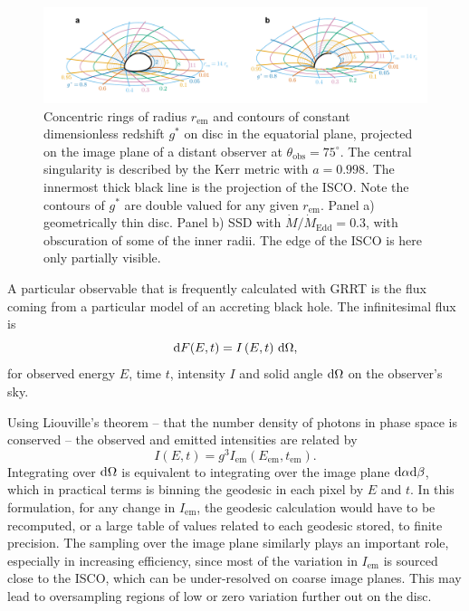 \begin{figure}
    \centering
    \includegraphics[width=0.95\linewidth]{figures/transfer-function.parameterization.pdf}
    \caption{Concentric rings of radius $r_\text{em}$ and contours of constant dimensionless redshift $g^\ast$ on disc in the equatorial plane, projected on the image plane of a distant observer at $\theta_\text{obs} = 75^\circ$. The central singularity is described by the Kerr metric with $a = 0.998$. The innermost thick black line is the projection of the ISCO. Note the contours of $g^\ast$ are double valued for any given $r_\text{em}$. Panel a) geometrically thin disc. Panel b) SSD with $\dot{M} / \dot{M}_\text{Edd} = 0.3$, with obscuration of some of the inner radii. The edge of the ISCO is here only partially visible.}
    \label{fig:transfer-parameterisation}
\end{figure}

A particular observable that is frequently calculated with GRRT is the flux coming from a particular model of an accreting black hole. The infinitesimal flux is
\begin{equation}
\label{eq:infinitesimal-flux}
\text{d} F(E, t) = I\left(E, t\right)\, \text{d} \Omega,
\end{equation}
for observed energy $E$, time $t$, intensity $I$ and solid angle $\text{d} \Omega$ on the observer's sky.

Using Liouville's theorem -- that the number density of photons in phase space is conserved -- the observed and emitted intensities are related by
\begin{equation}
\label{eq:liouville-theorem}
    I\left( E, t \right) = g^3 I_\text{em}\left(E_\text{em}, t_\text{em}\right).
\end{equation}
Integrating over $\text{d} \Omega$ is equivalent to integrating over the image plane $\text{d} \alpha \text{d} \beta$, which in practical terms is binning the geodesic in each pixel by $E$ and $t$. In this formulation, for any change in $I_\text{em}$, the geodesic calculation would have to be recomputed, or a large table of values related to each geodesic stored, to finite precision. The sampling over the image plane similarly plays an important role, especially in increasing efficiency, since most of the variation in $I_\text{em}$ is sourced close to the ISCO, which can be under-resolved on coarse image planes. This may lead to oversampling regions of low or zero variation further out on the disc.

